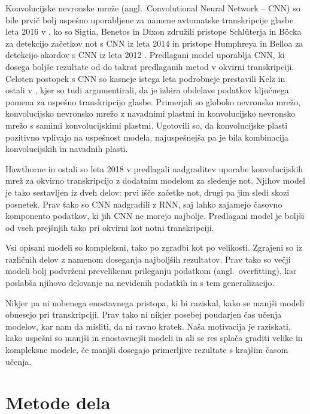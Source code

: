 \documentclass[a4paper, 12pt, openright]{book}
\newcommand{\en}{angl.}
\newcommand{\comment}[1]{}
\begin{document}
Konvolucijske nevronske mreže (\en\ Convolutional Neural Network -- CNN) so bile prvič bolj uspešno uporabljene za namene avtomatske transkripcije glasbe leta 2016 v \cite{sigtia2016endtoend}, ko so Sigtia, Benetos in Dixon združili pristope Schlüterja in Böcka za detekcijo začetkov not s CNN iz leta 2014 \cite{schluter2014onsetcnn} in pristope Humphreya in Belloa za detekcijo akordov s CNN iz leta 2012 \cite{humphrey2012rethinking}.
Predlagani model uporablja CNN, ki dosega boljše rezultate od do takrat predlaganih metod v okvirni transkripciji.
Celoten postopek s CNN so kasneje istega leta podrobneje prestavili Kelz in ostali v \cite{kelz2016potential}, kjer so tudi argumentirali, da je izbira obdelave podatkov ključnega pomena za uspešno transkripcijo glasbe.
Primerjali so globoko nevronsko mrežo, konvolucijsko nevronsko mrežo z navadnimi plastmi in konvolucijsko nevronsko mrežo s samimi konvolucijskimi plastmi.
Ugotovili so, da konvolucijske plasti pozitivno vplivajo na uspešnost modela, najuspešnejša pa je bila kombinacija konvolucijskih in navadnih plasti.

Hawthorne in ostali so leta 2018 v \cite{hawthorne2018onsets} predlagali nadgraditev uporabe konvolucijskih mrež za okvirno transkripcijo z dodatnim modelom za sledenje not.
Njihov model je tako sestavljen iz dveh delov: prvi išče začetke not, drugi pa jim sledi skozi posnetek.
Prav tako so CNN nadgradili z RNN, saj lahko zajamejo časovno komponento podatkov, ki jih CNN ne morejo najbolje.
Predlagani model je boljši od vseh prejšnjih tako pri okvirni kot notni transkripciji.

Vsi opisani modeli so kompleksni, tako po zgradbi kot po velikosti.
Zgrajeni so iz različnih delov z namenom doseganja najboljših rezultatov.
Prav tako so večji modeli bolj podvrženi prevelikemu prileganju podatkom (\en\ overfitting), kar poslabša njihovo delovanje na nevidenih podatkih in s tem generalizacijo.

\comment{TODO najdi članke ki probavajo manjše modele}

Nikjer pa ni nobenega enostavnega pristopa, ki bi raziskal, kako se manjši modeli obnesejo pri transkripciji.
Prav tako ni nikjer posebej poudarjen čas učenja modelov, kar nam da misliti, da ni ravno kratek.
Naša motivacija je raziskati, kako uspešni so manjši in enostavnejši modeli in ali se res splača graditi velike in kompleksne modele, če manjši dosegajo primerljive rezultate s krajšim časom učenja.


\chapter{Metode dela}
\label{ch:methods}
\end{document}
